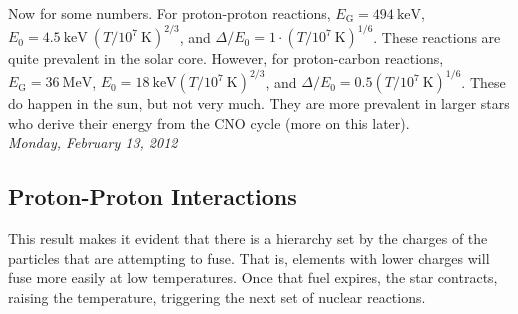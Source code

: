 \documentclass[10pt]{article}
\numberwithin{equation}{section}
\newcommand{\n}{\noindent}
\begin{document}
  Now for some numbers. For proton-proton reactions,
  $E_{\mathrm{G}}=494\ \mathrm{keV}$, $E_0=4.5\ \mathrm{keV}\
  \left(T/10^7\ \mathrm{K}\right)^{2/3}$, and $\Delta/E_0=1\cdot
  (T/10^7\ \mathrm{K})^{1/6}$. These reactions are quite prevalent in
  the solar core. However, for proton-carbon reactions,
  $E_\mathrm{G}=36\ \mathrm{MeV}$, $E_0=18\ \mathrm{keV}(T/10^7\
  \mathrm{K})^{2/3}$, and $\Delta/E_0=0.5(T/10^7\
  \mathrm{K})^{1/6}$. These do happen in the sun, but not very
  much. They are more prevalent in larger stars who derive their
  energy from the CNO cycle (more on this later).\\
  
  \n \textit{Monday, February 13, 2012}\\

  \subsection{Proton-Proton Interactions}
  \label{sec:prot-prot-inter}

  \n This result makes it evident that there is a hierarchy set by the
  charges of the particles that are attempting to fuse. That is,
  elements with lower charges will fuse more easily at low
  temperatures. Once that fuel expires, the star contracts, raising
  the temperature, triggering the next set of nuclear reactions.\\
\end{document}
